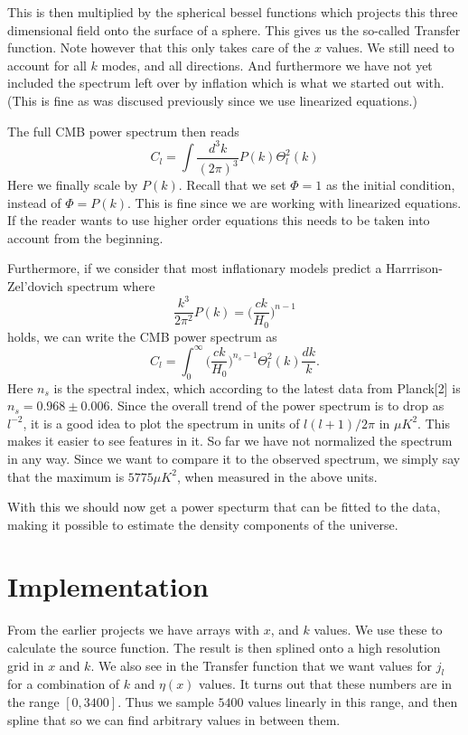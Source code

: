 \documentclass[a4paper]{report}
\begin{document}
This is then multiplied by the spherical bessel functions which projects this three dimensional field onto the surface of a sphere. This gives us the so-called Transfer function. Note however that this only takes care of the $x$ values. We still need to account for all $k$ modes, and all directions. And furthermore we have not yet included the spectrum left over by inflation which is what we started out with. (This is fine as was discused previously since we use linearized equations.)

The full CMB power spectrum then reads 
\begin{equation}
 C_l = \int\frac{d^3k}{(2\pi)^3}P(k)\Theta_l^2(k)
\end{equation}
Here we finally scale by $P(k)$. Recall that we set $\Phi = 1$ as the initial condition, instead of $\Phi = P(k)$. This is fine since we are working with linearized equations. If the reader wants to use higher order equations this needs to be taken into account from the beginning.

Furthermore, if we consider that most inflationary models predict a Harrrison-Zel'dovich spectrum where 
\begin{equation}
 \frac{k^3}{2\pi^2}P(k) = \bigg(\frac{ck}{H_0}\bigg)^{n-1}
\end{equation}
holds, we can write the CMB power spectrum as
\begin{equation}
  C_l = \int_0^\infty\bigg(\frac{ck}{H_0}\bigg)^{n_s-1}\Theta_l^2(k)\frac{dk}{k}.
\end{equation}
Here $n_s$ is the spectral index, which according to the latest data from Planck[2] is $n_s = 0.968\pm0.006$.
Since the overall trend of the power spectrum is to drop as $l^{-2}$, it is a good idea to plot the spectrum in units of $l(l+1)/2\pi$ in $\mu K^2$. This makes it easier to see features in it. So far we have not normalized the spectrum in any way. Since we want to compare it to the observed spectrum, we simply say that the maximum is $5775\mu K^2$, when measured in the above units.

With this we should now get a power specturm that can be fitted to the data, making it possible to estimate the density components of the universe.

\section{Implementation}\label{sec:Imp}
From the earlier projects we have arrays with $x$, and $k$ values. We use these to calculate the source function. The result is then splined onto a high resolution grid in $x$ and $k$. We also see in the Transfer function that we want values for $j_l$ for a combination of $k$ and $\eta(x)$ values. It turns out that these numbers are in the range $[0,3400]$. Thus we sample $5400$ values linearly in this range, and then spline that so we can find arbitrary values in between them. 
\end{document}
